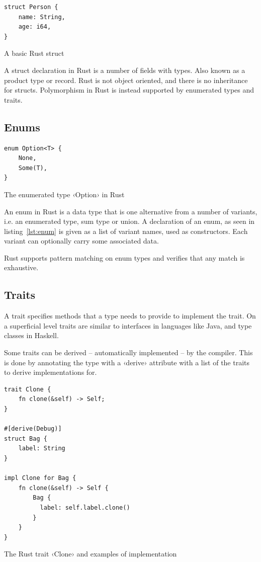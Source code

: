 \begin{listing}[ht!]
\begin{verbatim}
struct Person {
    name: String,
    age: i64,
}
\end{verbatim}
\caption{A basic Rust struct}
\label{lst:struct}
\end{listing}

A struct declaration in Rust is a number of fields with types. Also known as a product type or record. Rust is not object oriented, and there is no inheritance for structs. Polymorphism in Rust is instead supported by enumerated types and traits.

\subsection{Enums}

\begin{listing}[ht!]
\begin{verbatim}
enum Option<T> {
    None,
    Some(T),
}
\end{verbatim}
\caption{The enumerated type ‹Option› in Rust}
\label{lst:enum}
\end{listing}

An enum in Rust is a data type that is one alternative from a number of variants, i.e. an enumerated type, sum type or union. A declaration of an enum, as seen in listing~\ref{lst:enum} is given as a list of variant names, used as constructors. Each variant can optionally carry some associated data.

Rust supports pattern matching on enum types and verifies that any match is exhaustive.

\subsection{Traits}
\label{sec:traits}

A trait specifies methods that a type needs to provide to implement the trait. On a superficial level traits are similar to interfaces in languages like Java, and type classes in Haskell.

Some traits can be derived -- automatically implemented -- by the compiler. This is done by annotating the type with a ‹derive› attribute with a list of the traits to derive implementations for.

\begin{listing}[ht!]
\begin{verbatim}
trait Clone {
    fn clone(&self) -> Self;
}

#[derive(Debug)]
struct Bag {
    label: String
}

impl Clone for Bag {
    fn clone(&self) -> Self {
        Bag {
          label: self.label.clone()
        }
    }
}
\end{verbatim}
\caption{The Rust trait ‹Clone› and examples of implementation}
\label{lst:trait}
\end{listing}

